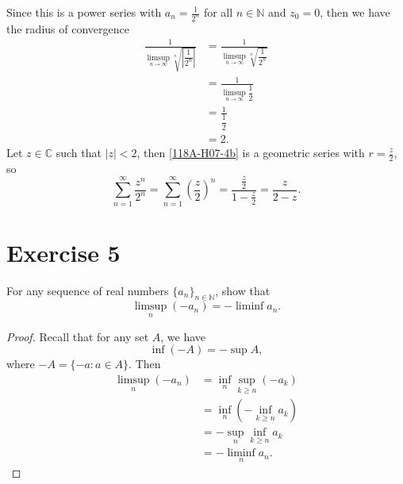 \documentclass[12pt]{article}
\newenvironment{problem}
    {\begin{lrbox}{\mybox}\begin{minipage}{0.98\textwidth}}
    {\end{minipage}\end{lrbox}\framebox[\textwidth]{\usebox{\mybox}}}
\newcommand{\ds}{\displaystyle}
\newcommand{\N}{\mathbb{N}} %
\newcommand{\C}{\mathbb{C}} %
\newcommand{\<}{\left\langle} %
\renewcommand{\>}{\right\rangle} %
\begin{document}
Since this is a power series with $a_n = \frac1{2^n}$ for all $n\in\N$ and $z_0 = 0$, then we have the radius of convergence
\begin{align*}
    \frac1{\ds\limsup_{n\to\infty}\sqrt[n]{\left|\dfrac1{2^n}\right|}}
        &= \frac1{\ds\limsup_{n\to\infty}\sqrt[n]{\dfrac1{2^n}}} \\
        &= \frac1{\ds\limsup_{n\to\infty}\dfrac12} \\
        &= \frac1{\dfrac12}\\
        &= 2.
\end{align*}
Let $z\in\C$ such that $|z|<2$, then \eqref{118A-H07-4b} is a geometric series with $r=\frac{z}{2}$, so
\[\sum_{n=1}^\infty  \frac{z^n}{2^n} = \sum_{n=1}^\infty \left(\frac{z}{2}\right)^n = \frac{\frac{z}{2}}{1-\frac{z}{2}} = \frac{z}{2-z}.\]

\newpage
\section*{Exercise 5}
\begin{problem}
    For any sequence of real numbers $\{a_n\}_{n\in\N}$, show that 
    \begin{equation}
        \limsup_n (-a_n) = - \liminf a_n.
    \end{equation}
\end{problem}

\begin{proof}
    Recall that for any set $A$, we have
    \[\inf(-A) = -\sup A,\]
    where $-A = \{-a : a\in A\}$. Then
    \begin{align*}
        \limsup_n (-a_n)
            &= \inf_n\sup_{k\geq n} (-a_k) \\[1em]
            &= \inf_n(-\inf_{k\geq n} a_k) \\[1em]
            &= -\sup_n\inf_{k\geq n} a_k \\[1em]
            &= - \liminf_n a_n.
    \end{align*}
    
\end{proof}
\end{document}
